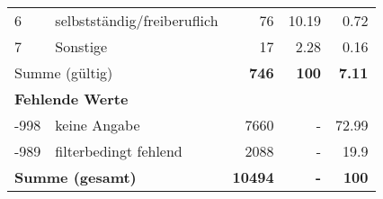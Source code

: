 \begin{longtable}{lXrrr}
     6 &
     \multicolumn{1}{X}{ selbstständig/freiberuflich   } &


       \num{76} &
       \num[round-mode=places,round-precision=2]{10,19} &
         \num[round-mode=places,round-precision=2]{0,72} \\

     7 &
     \multicolumn{1}{X}{ Sonstige   } &


       \num{17} &
       \num[round-mode=places,round-precision=2]{2,28} &
         \num[round-mode=places,round-precision=2]{0,16} \\
     \midrule
     \multicolumn{2}{l}{Summe (gültig)} &
       \textbf{\num{746}} &
     \textbf{100} &
       \textbf{\num[round-mode=places,round-precision=2]{7,11}} \\
     \multicolumn{5}{l}{\textbf{Fehlende Werte}}\\
       -998 &
       keine Angabe &
         \num{7660} &
        - &
         \num[round-mode=places,round-precision=2]{72,99} \\
       -989 &
       filterbedingt fehlend &
         \num{2088} &
        - &
         \num[round-mode=places,round-precision=2]{19,9} \\
     \midrule
     \multicolumn{2}{l}{\textbf{Summe (gesamt)}} &
          \textbf{\num{10494}} &
        \textbf{-} &
        \textbf{100} \\
     \bottomrule
     \end{longtable}
     
